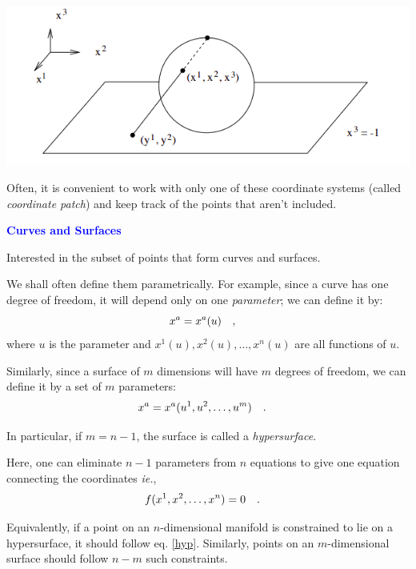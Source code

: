 \documentclass[landscape,aspectratio=169]{slides}
\begin{document}
\begin{slide}
	\includegraphics{images/stereograph.png}

	Often, it is convenient to work with only one of these coordinate systems (called \textit{coordinate patch}) and keep track of the points that aren't included.
\end{slide}
\begin{slide}	
	\textcolor{blue}{\textbf{Curves and Surfaces}}
	
	Interested in the subset of points that form curves and surfaces.
	
	We shall often define them parametrically. For example, since a curve has one degree of freedom, it will depend only on one \textit{parameter}; we can define it by:
	\begin{equation}\label{key}
	x^a = x^a(u) \qq{,}
	\end{equation}
	where $ u $ is the parameter and $ x^1(u), x^2(u), \ldots, x^n(u) $ are all functions of $ u $.
	
	Similarly, since a surface of $ m $ dimensions will have $m$ degrees of freedom, we can define it by a set of $ m $ parameters:
	\begin{equation}\label{key}
	x^a = x^a(u^1, u^2, \ldots, u^m) \qq{.}
	\end{equation}
\end{slide}	
\begin{slide}
	In particular, if $ m=n-1 $, the surface is called a \textit{hypersurface}. 
	
	Here, one can eliminate $ n-1 $ parameters from $ n $ equations to give one equation connecting the coordinates \textit{ie.},
	\begin{equation}\label{hyp}
	f(x^1, x^2, \ldots, x^n) = 0 \qq{.}
	\end{equation}
	
	Equivalently, if a point on an $ n $-dimensional manifold is constrained to lie on a hypersurface, it should follow eq. \ref{hyp}. Similarly, points on an $ m $-dimensional surface should follow $ n-m $ such constraints.
\end{slide}
\end{document}
